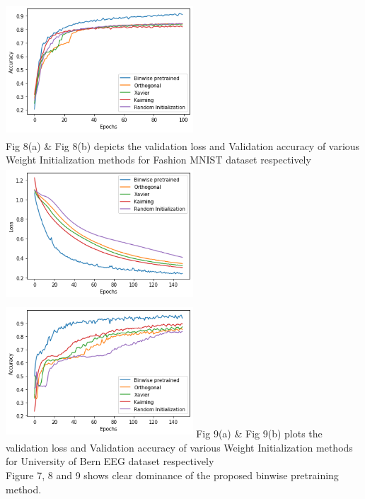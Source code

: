 \documentclass{article}
\begin{document}
\includegraphics[width= 7cm, height=5cm]{fig6.png}
\\
Fig 8(a) \& Fig 8(b) depicts the validation loss and Validation accuracy of various Weight Initialization methods for Fashion MNIST dataset respectively
\\
\includegraphics[width= 7cm, height=5cm]{fig3.png}
\includegraphics[width= 7cm, height=5cm]{fig4.png}
Fig 9(a) \& Fig 9(b) plots the validation loss and Validation accuracy of various Weight Initialization methods for University of Bern EEG dataset respectively
\\
Figure 7, 8 and 9 shows clear dominance of the proposed binwise pretraining method.
\\
\end{document}
